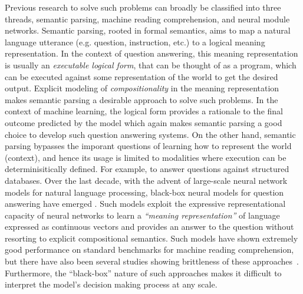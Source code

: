 \documentclass[main.tex]{subfiles}
\begin{document}
Previous research to solve such problems can broadly be classified into three threads, semantic parsing, machine reading comprehension, and neural module networks.  Semantic parsing, rooted in formal semantics, aims to map a natural language utterance (e.g. question, instruction, etc.) to a logical meaning representation.  In the context of question answering, this meaning representation is usually an \textit{executable logical form}, that can be thought of as a program, which can be executed against some representation of the world to get the desired output.  Explicit modeling of \textit{compositionality} in the meaning representation makes semantic parsing a desirable approach to solve such problems.
In the context of machine learning, the logical form provides a rationale to the final outcome predicted by the model which again makes semantic parsing a good choice to develop such question answering systems.  On the other hand, semantic parsing bypasses the imporant questions of learning how to represent the world (context), and hence its usage is limited to modalities where execution can be determinisitically defined. For example, to answer questions against structured databases. 
Over the last decade, with the advent of large-scale neural network models for natural language processing, black-box neural models for question answering have emerged .
Such models exploit the expressive representational capacity of neural networks to learn a \textit{``meaning representation''} of language expressed as continuous vectors and provides an answer to the question without resorting to explicit compositional semantics.  Such models have shown extremely good performance on standard benchmarks for machine reading comprehension, but there have also been several studies showing brittleness of these approaches~.  Furthermore, the ``black-box'' nature of such approaches makes it difficult to interpret the model's decision making process at any scale.
\end{document}
